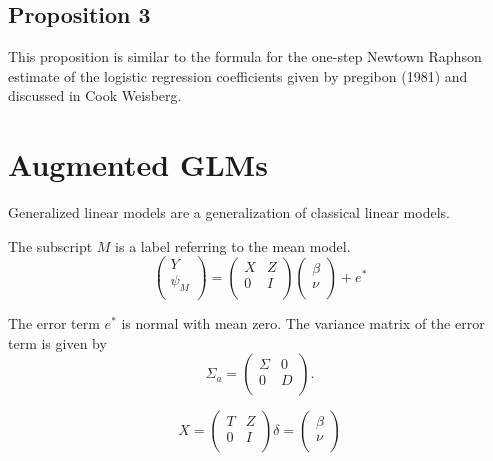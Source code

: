 \documentclass[12pt, a4paper]{report}
\theoremstyle{plain}
\theoremstyle{definition}
\theoremstyle{remark}
\begin{document}
\subsection{Proposition 3}
This proposition is similar to the formula for the one-step Newtown Raphson estimate of the logistic regression coefficients given by pregibon (1981)
and discussed in Cook Weisberg.

\newpage
\section{Augmented GLMs} %


Generalized linear models are a generalization of classical linear
models.

The subscript $M$ is a label referring to the mean model.
\begin{equation}
\left(%
\begin{array}{c}
  Y \\
  \psi_{M} \\
\end{array}%
\right) = \left(
\begin{array}{cc}
  X & Z \\
  0 & I \\
\end{array}\right) \left(%
\begin{array}{c}
  \beta \\
  \nu \\
\end{array}%
\right)+ e^{*}
\end{equation}




The error term $e^{*}$ is normal with mean zero. The variance matrix of the error term is given by
\begin{equation}
\Sigma_{a} = \left(%
\begin{array}{cc}
  \Sigma & 0 \\
  0 & D \\
\end{array}%
\right).
\end{equation}

\begin{equation}
X = \left(%
\begin{array}{cc}
  T & Z \\
  0 & I \\
\end{array}%
\right)
\delta = \left(%
\begin{array}{c}
  \beta  \\
  \nu  \\
\end{array}%
\right)
\end{equation}
\end{document}
